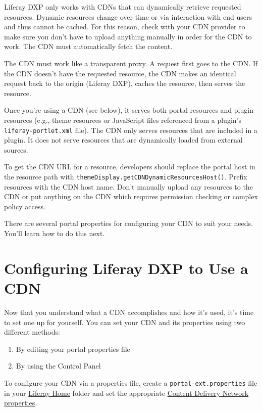Liferay DXP only works with CDNs that can dynamically retrieve requested
resources. Dynamic resources change over time or via interaction with
end users and thus cannot be cached. For this reason, check with your
CDN provider to make sure you don't have to upload anything manually in
order for the CDN to work. The CDN must automatically fetch the content.

The CDN must work like a transparent proxy. A request first goes to the
CDN. If the CDN doesn't have the requested resource, the CDN makes an
identical request back to the origin (Liferay DXP), caches the resource,
then serves the resource.

Once you're using a CDN (see below), it serves both portal resources and
plugin resources (e.g., theme resources or JavaScript files referenced
from a plugin's \texttt{liferay-portlet.xml} file). The CDN only serves
resources that are included in a plugin. It does not serve resources
that are dynamically loaded from external sources.

To get the CDN URL for a resource, developers should replace the portal
host in the resource path with
\texttt{themeDisplay.getCDNDynamicResourcesHost()}. Prefix resources
with the CDN host name. Don't manually upload any resources to the CDN
or put anything on the CDN which requires permission checking or complex
policy access.

There are several portal properties for configuring your CDN to suit
your needs. You'll learn how to do this next.

\section{Configuring Liferay DXP to Use a
CDN}\label{configuring-liferay-dxp-to-use-a-cdn}

Now that you understand what a CDN accomplishes and how it's used, it's
time to set one up for yourself. You can set your CDN and its properties
using two different methods:

\begin{enumerate}
\def\labelenumi{\arabic{enumi}.}
\item
  By editing your portal properties file
\item
  By using the Control Panel
\end{enumerate}

To configure your CDN via a properties file, create a
\texttt{portal-ext.properties} file in your
\href{/docs/7-2/deploy/-/knowledge_base/d/liferay-home}{Liferay Home}
folder and set the appropriate
\href{@platform-ref@/7.2-latest/propertiesdoc/portal.properties.html\#Content\%20Delivery\%20Network}{Content
Delivery Network properties}.

